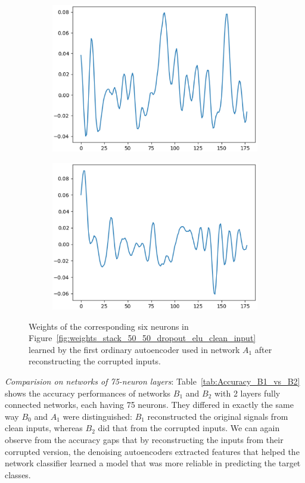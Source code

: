 \documentclass[12pt]{article}
\begin{document}
\begin{figure}
\begin{subfigure}{.5\textwidth}
  \centering
  \includegraphics[width=.8\linewidth]{figures/stack_50_50_dropout_elu/weights_neuron_4.eps}
\end{subfigure}
\begin{subfigure}{.5\textwidth}
  \centering
  \includegraphics[width=.8\linewidth]{figures/stack_50_50_dropout_elu/weights_neuron_8.eps}
\end{subfigure}
\caption{Weights of the corresponding six neurons in Figure~\ref{fig:weights_stack_50_50_dropout_elu_clean_input} learned by the first ordinary autoencoder used in network $A_1$ after reconstructing the corrupted inputs.}
\label{fig:weights_stack_50_50_dropout_elu}
\end{figure}

\textit{Comparision on networks of 75-neuron layers}: Table~\ref{tab:Accuracy_B1_vs_B2} shows the accuracy performances of networks $B_1$ and $B_2$ with 2 layers fully connected networks, each having 75 neurons. They differed in exactly the same way $B_0$ and $A_1$ were distinguished: $B_1$ reconstructed the original signals from clean inputs, whereas $B_2$ did that from the corrupted inputs. We can again observe from the accuracy gaps that by reconstructing the inputs from their corrupted version, the denoising autoencoders extracted features that helped the network classifier learned a model that was more reliable in predicting the target classes.
\end{document}
